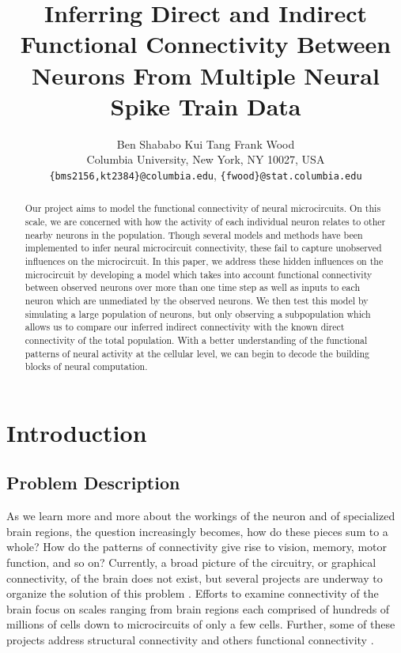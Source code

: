 \documentclass{article}
\title{Inferring Direct and Indirect Functional Connectivity Between Neurons From Multiple Neural Spike Train Data}
\author{
Ben Shababo \hspace{1cm} Kui Tang \hspace{1 cm}Frank Wood\\
Columbia University, New York, NY 10027, USA \\
\texttt{\{bms2156,kt2384\}@columbia.edu},
\texttt{\{fwood\}@stat.columbia.edu} 
}
\begin{document}
\maketitle

\begin{abstract}
Our project aims to model the functional connectivity of neural
microcircuits. On this scale, we are concerned with how the activity
of each individual neuron relates to other nearby neurons in the
population. Though several models and methods have been implemented
to infer neural microcircuit connectivity, these fail to capture
unobserved influences on the microcircuit. In this paper, we address
these hidden influences on the microcircuit by developing a model
which takes into account functional connectivity between observed
neurons over more than one time step as well as inputs to each
neuron which are unmediated by the observed neurons. We then test
this model by simulating a large population of neurons, but only
observing a subpopulation which allows us to compare our inferred
indirect connectivity with the known direct connectivity of the
total population. With a better understanding of the functional
patterns of neural activity at the cellular level, we can begin to
decode the building blocks of neural computation.
\end{abstract}

\section{Introduction}
\label{sec:introduction}

\subsection{Problem Description}

As we learn more and more about the workings of the neuron and of
specialized brain regions, the question increasingly becomes, how
do these pieces sum to a whole? How do the patterns of connectivity
give rise to vision, memory, motor function, and so on? Currently,
a broad picture of the circuitry, or graphical connectivity, of the
brain does not exist, but several projects are underway to organize
the solution of this problem \citep{Marcus2011, Bohland2009}. Efforts
to examine connectivity of the brain focus on scales ranging from
brain regions each comprised of hundreds of millions of cells down
to microcircuits of only a few cells. Further, some of these projects
address structural connectivity and others functional connectivity
\citep{KnowlesBarley2011, Jain2010, Ropireddy2011, Chiang2011, bhattacharya2006}.
\end{document}
